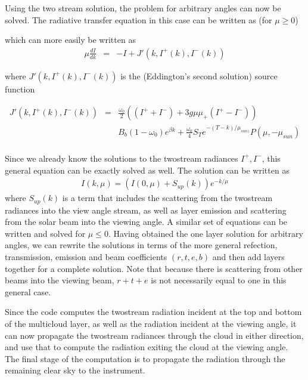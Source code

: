 \documentclass[11pt]{article}
\begin{document}
Using the two stream solution, the problem for arbitrary angles can now be 
solved. The radiative transfer equation in this case can be written as 
(for $\mu \geq 0$)

which can more easily be written as 
\[
\begin{array}{ccc}
\mu \frac{dI}{dk} & = & -I + J\prime(k,I^{+}(k),I^{-}(k))
\end{array}
\]

where $J\prime(k,I^{+}(k),I^{-}(k))$ is the (Eddington's second 
solution) source function

\[
\begin{array}{ccc}
J\prime(k,I^{+}(k),I^{-}(k)) & = & \frac{\omega_{0}}{2} \left(
(I^{+} + I^{-}) + 3g\mu \mu_{+}(I^{+} - I^{-}) \right) \\
                             & & B_{b}(1-\omega_{0})e^{\beta k} + 
\frac{\omega_{0}}{4}S_{T}e^{-(T-k)/\mu_{sun)}}P(\mu,-\mu_{sun}) \\
\end{array}
\]

Since we already know the solutions to the twostream radiances $I^{+},I^{-}$,
this general equation can be exactly solved as well. The solution can be 
written as
\[
\begin{array}{ccc}
I(k,\mu) = \left( I(0,\mu) + S_{up}(k) \right) e^{-k/\mu}
\end{array}
\]
where $S_{up}(k)$ is a term that includes the scattering from the twostream
radiances into the view angle stream, as well as layer emission and 
scattering from the solar beam into the viewing angle. A similar set of 
equations can be written and solved for $\mu \leq 0$. Having obtained the one
layer solution for arbitrary angles, we can rewrite the solutions in terms 
of the more general refection, transmission, emission and beam coefficients
$(r,t,e,b)$ and then add layers together for a complete solution. Note that 
because there is scattering from other beams into the viewing beam, $r+t+e$ 
is not necessarily equal to one in this general case. 

Since the code computes the twostream radiation incident at the top and
bottom of the multicloud layer, as well as the radiation incident at the
viewing angle, it can now propagate the twostream radiances through the cloud 
in either direction, and use that to compute the radiation exiting the cloud 
at the viewing angle. The final stage of the computation is to propagate the 
radiation through the remaining clear sky to the instrument.
\end{document}
